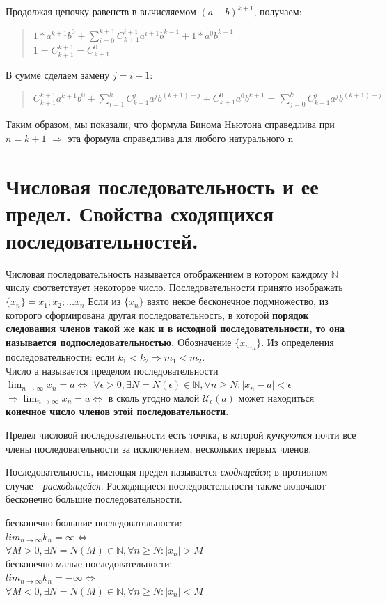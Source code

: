 \documentclass[oneside]{book}
\begin{document}
\begin{enumerate}
Продолжая цепочку равенств в вычисляемом $(a+b)^{k+1}$, получаем:
\begin{quote}$1*a^{k+1}b^0+\sum\limits_{i=0}^{k+1}C_{k+1}^{i+1}a^{i+1}b^{k-1}+1*a^0b^{k+1}$\\
$1=C_{k+1}^{k+1}=C_{k+1}^0$\end{quote}
В сумме сделаем замену $j=i+1$:
\begin{quote}$C_{k+1}^{k+1}a^{k+1}b^0+\sum\limits_{i=1}^kC_{k+1}^ja^jb^{(k+1)-j}+C_{k+1}^0a^0b^{k+1}=\sum\limits_{j=0}^kC_{k+1}^j a^j b^{(k+1)-j}$
\end{quote}
Таким образом, мы показали, что формула Бинома Ньютона справедлива при $n=k+1$ $\Rightarrow$ эта формула справедлива для любого натурального n
\end{enumerate}
\setcounter{chapter}{4}
\chapter[Последовательности]{Числовая последовательность и ее предел. Свойства сходящихся последовательностей.}
Числовая последовательность называется отображением в котором каждому $\mathbb{N}$ числу соответствует
некоторое число. Последовательности принято изображать $\{x_n\} = x_1; x_2; \dots x_n$
Если из $\{x_n\}$ взято некое бесконечное подмножество, из которого сформирована другая последовательность,
в которой \textbf{порядок следования членов такой же как и в исходной последовательности, то она
	называется подпоследовательностью.} Обозначение $\{{x_n}_m\}$.
Из определения последовательности: если $k_1 < k_2 \Rightarrow m_1 < m_2$.\\
Число а называется пределом последовательности \\ $\lim_{n \rightarrow \infty}{x_n = a} \Leftrightarrow$
$\forall\epsilon>0,  \exists N=N(\epsilon) \in \mathbb{N}, \forall n \geq N: |x_n - a| < \epsilon$
$\Rightarrow \lim_{n \rightarrow \infty}{x_n = a} \Leftrightarrow$ в сколь угодно малой $\mathcal{U}_\epsilon(a)$
может находиться \textbf{конечное число членов этой последовательности}.

Предел числовой последовательности есть точчка, в которой \textit{кучкуются} почти все члены последовательности
за исключением, нескольких первых членов.

Последовательность, имеющая предел называется \textit{сходящейся}; в противном случае - \textit{расходящейся}.
Расходящиеся последовстельности также включают бесконечно большие последовательности.
\begin{center}
	бесконечно большие последовательности:\\
	$lim_{n \rightarrow \infty}{k_n} = \infty \Leftrightarrow$ \\
	$\forall M > 0, \exists N=N(M) \in \mathbb{N}, \forall n \geq N: |x_n| > M$ \\
	бесконечно малые последовательности:\\
	$lim_{n \rightarrow \infty}{k_n} = -\infty \Leftrightarrow$\\
	$\forall M < 0, \exists N=N(M) \in \mathbb{N}, \forall n \geq N: |x_n| < M$ \\
\end{center}
\end{document}
